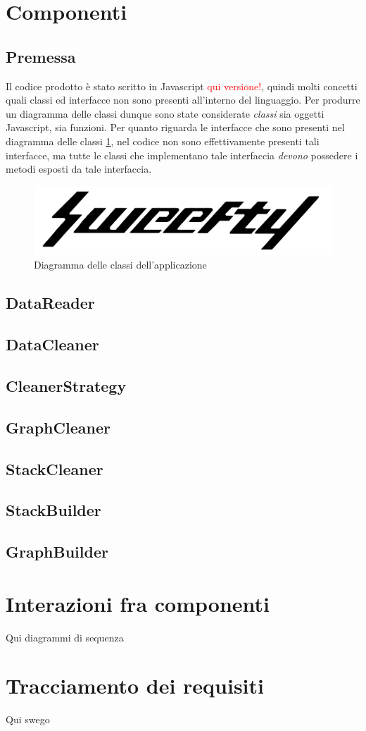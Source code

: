 \section{Componenti}
\subsection{Premessa}
Il codice prodotto è stato scritto in Javascript \textcolor{red}{qui versione!}, quindi molti concetti quali classi ed interfacce non sono presenti all'interno del linguaggio. Per produrre un diagramma delle classi dunque sono state considerate \emph{ classi } sia oggetti Javascript, sia funzioni. Per quanto riguarda le interfacce che sono presenti nel diagramma delle classi \ref{diagrammaClassi}, nel codice non sono effettivamente presenti tali interfacce, ma tutte le classi che implementano tale interfaccia \emph{devono} possedere i metodi esposti da tale interfaccia.

\begin{figure}[H]
    \label{diagrammaClassi}
    \centering
    \includegraphics[width=1\textwidth]{Images/logo.jpg}
    \caption{Diagramma delle classi dell'applicazione}
\end{figure}

\subsection{DataReader}
\subsection{DataCleaner}
\subsection{CleanerStrategy}
\subsection{GraphCleaner}
\subsection{StackCleaner}
\subsection{StackBuilder}
\subsection{GraphBuilder}

\section{Interazioni fra componenti}

Qui diagrammi di sequenza

\section{Tracciamento dei requisiti}

Qui swego 
